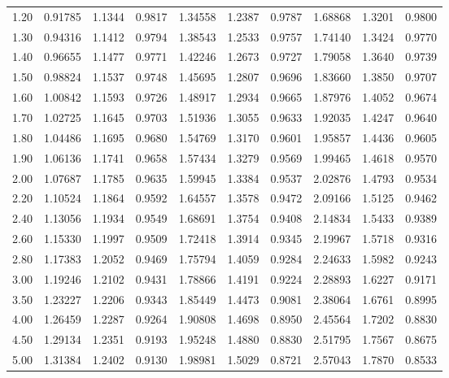 {\begin{longtable}{|||j{3.2}|X|X|X|||}
1.20   & 0.91785  & 1.1344  & 0.9817  & 1.34558   & 1.2387  & 0.9787  & 1.68868  & 1.3201  & 0.9800 \\ 
1.30   & 0.94316  & 1.1412  & 0.9794  & 1.38543   & 1.2533  & 0.9757  & 1.74140  & 1.3424  & 0.9770 \\  
1.40   & 0.96655  & 1.1477  & 0.9771  & 1.42246   & 1.2673  & 0.9727  & 1.79058  & 1.3640  & 0.9739 \\  
1.50   & 0.98824  & 1.1537  & 0.9748  & 1.45695   & 1.2807  & 0.9696  & 1.83660  & 1.3850  & 0.9707 \\ 
1.60   & 1.00842  & 1.1593  & 0.9726  & 1.48917   & 1.2934  & 0.9665  & 1.87976  & 1.4052  & 0.9674 \\  
1.70   & 1.02725  & 1.1645  & 0.9703  & 1.51936   & 1.3055  & 0.9633  & 1.92035  & 1.4247  & 0.9640 \\* 
1.80   & 1.04486  & 1.1695  & 0.9680  & 1.54769   & 1.3170  & 0.9601  & 1.95857  & 1.4436  & 0.9605 \\*  
1.90   & 1.06136  & 1.1741  & 0.9658  & 1.57434   & 1.3279  & 0.9569  & 1.99465  & 1.4618  & 0.9570 \\[6pt]  
%
2.00   & 1.07687  & 1.1785  & 0.9635  & 1.59945   & 1.3384  & 0.9537  & 2.02876  & 1.4793  & 0.9534 \\*  
2.20   & 1.10524  & 1.1864  & 0.9592  & 1.64557   & 1.3578  & 0.9472  & 2.09166  & 1.5125  & 0.9462 \\  
2.40   & 1.13056  & 1.1934  & 0.9549  & 1.68691   & 1.3754  & 0.9408  & 2.14834  & 1.5433  & 0.9389 \\  
2.60   & 1.15330  & 1.1997  & 0.9509  & 1.72418   & 1.3914  & 0.9345  & 2.19967  & 1.5718  & 0.9316 \\  
2.80   & 1.17383  & 1.2052  & 0.9469  & 1.75794   & 1.4059  & 0.9284  & 2.24633  & 1.5982  & 0.9243 \\ 
3.00   & 1.19246  & 1.2102  & 0.9431  & 1.78866   & 1.4191  & 0.9224  & 2.28893  & 1.6227  & 0.9171 \\     
3.50   & 1.23227  & 1.2206  & 0.9343  & 1.85449   & 1.4473  & 0.9081  & 2.38064  & 1.6761  & 0.8995 \\     
4.00   & 1.26459  & 1.2287  & 0.9264  & 1.90808   & 1.4698  & 0.8950  & 2.45564  & 1.7202  & 0.8830 \\*   
4.50   & 1.29134  & 1.2351  & 0.9193  & 1.95248   & 1.4880  & 0.8830  & 2.51795  & 1.7567  & 0.8675 \\*    
5.00   & 1.31384  & 1.2402  & 0.9130  & 1.98981   & 1.5029  & 0.8721  & 2.57043  & 1.7870  & 0.8533 \\[6pt]    

\end{longtable}}
